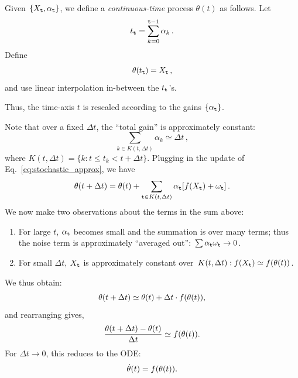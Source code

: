 Given $\{X_{\tt t}, \alpha_{\tt t}\}$, we define a {\em continuous-time} process
$\theta(t)$ as follows.  Let
$$
t_{\tt t} = \sum_{k=0}^{{\tt t}-1} \alpha_k\,.
$$
Define
$$
\theta(t_{\tt t}) = X_{\tt t}\,,
$$
and use linear interpolation in-between the $t_{\tt t}$'s.

Thus, the time-axis $t$ is rescaled according to the gains $\{\alpha_{\tt t}\}$.

\begin{center}
\end{center}


Note that over a fixed $\Delta t$, the ``total gain'' is approximately
constant:
$$
\sum_{k\in K(t, \Delta t)} \alpha_k \simeq \Delta t\,,
$$
where $K(t,\Delta t) = \{k: t \le t_k < t+ \Delta t\}$.
Plugging in the update of Eq.~\ref{eq:stochastic_approx}, we have
$$
\theta(t+\Delta t) = \theta(t) + \sum_{{\tt t}\in K(t, \Delta t)} \alpha_{\tt t} [f(X_{\tt t})
+\omega_{\tt t}] \,.
$$
We now make two observations about the terms in the sum above:
\begin{enumerate}
\item
For large $t$, $\alpha_{\tt t}$ becomes small and the summation is over many
terms; thus the noise term is approximately ``averaged out'':
$\sum \alpha_{\tt t} \omega_{\tt t} \to 0$.
\item
For small $\Delta t$, $X_{\tt t}$ is approximately constant over $K(t, \Delta t):
f(X_{\tt t}) \simeq f(\theta(t))$.
\end{enumerate}
We thus obtain:
$$
\theta(t+\Delta t) \simeq \theta(t) +\Delta t\cdot f (\theta(t)),
$$
and rearranging gives,
$$
\frac{\theta(t+\Delta t) - \theta(t)}{\Delta t} \simeq  f (\theta(t)).
$$
For $\Delta t \to 0$, this reduces to the ODE:
$$
\dot \theta(t) = f(\theta(t)).
$$


